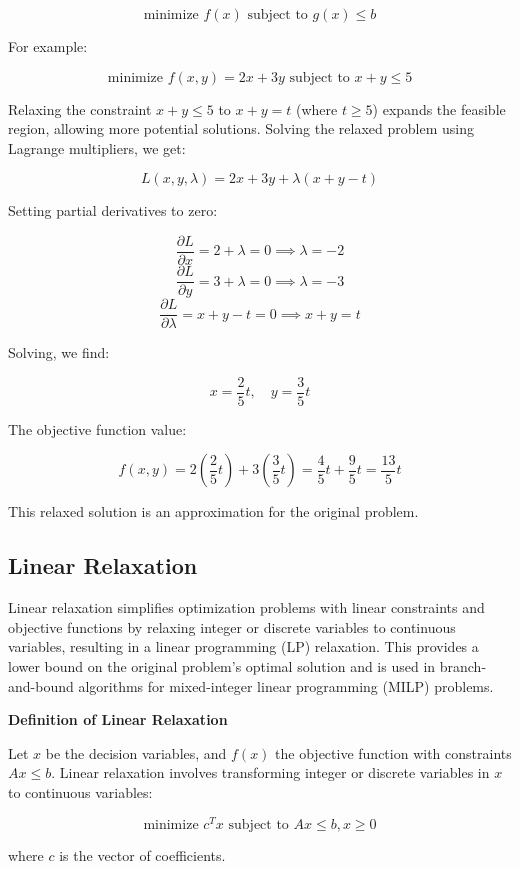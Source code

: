 \documentclass[12pt]{book} %
\begin{document}
\[
\text{minimize } f(x) \text{ subject to } g(x) \leq b
\]

For example:

\[
\text{minimize } f(x, y) = 2x + 3y \text{ subject to } x + y \leq 5
\]

Relaxing the constraint \(x + y \leq 5\) to \(x + y = t\) (where \(t \geq 5\)) expands the feasible region, allowing more potential solutions. Solving the relaxed problem using Lagrange multipliers, we get:

\[
L(x, y, \lambda) = 2x + 3y + \lambda(x + y - t)
\]

Setting partial derivatives to zero:

\[
\frac{\partial L}{\partial x} = 2 + \lambda = 0 \implies \lambda = -2
\]
\[
\frac{\partial L}{\partial y} = 3 + \lambda = 0 \implies \lambda = -3
\]
\[
\frac{\partial L}{\partial \lambda} = x + y - t = 0 \implies x + y = t
\]

Solving, we find:

\[
x = \frac{2}{5}t, \quad y = \frac{3}{5}t
\]

The objective function value:

\[
f(x, y) = 2\left(\frac{2}{5}t\right) + 3\left(\frac{3}{5}t\right) = \frac{4}{5}t + \frac{9}{5}t = \frac{13}{5}t
\]

This relaxed solution is an approximation for the original problem.

\subsection{Linear Relaxation}

Linear relaxation simplifies optimization problems with linear constraints and objective functions by relaxing integer or discrete variables to continuous variables, resulting in a linear programming (LP) relaxation. This provides a lower bound on the original problem's optimal solution and is used in branch-and-bound algorithms for mixed-integer linear programming (MILP) problems.

\textbf{Definition of Linear Relaxation}

Let \(x\) be the decision variables, and \(f(x)\) the objective function with constraints \(Ax \leq b\). Linear relaxation involves transforming integer or discrete variables in \(x\) to continuous variables:

\[
\text{minimize } c^Tx \text{ subject to } Ax \leq b, x \geq 0
\]

where \(c\) is the vector of coefficients.
\end{document}
